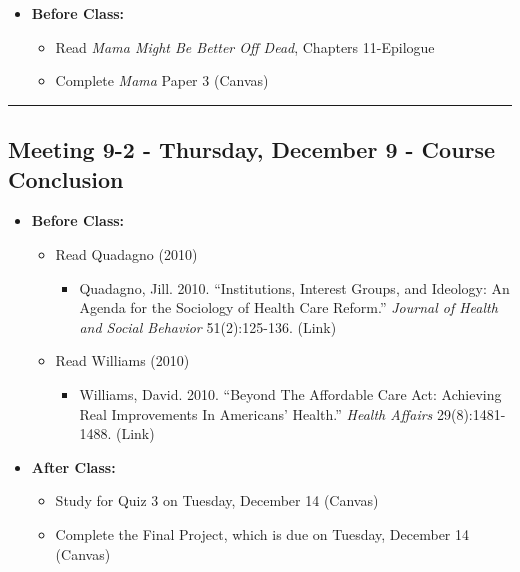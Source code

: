 \documentclass[
]{book}
\providecommand{\tightlist}{%
  \setlength{\itemsep}{0pt}\setlength{\parskip}{0pt}}
\begin{document}
\begin{itemize}
\tightlist
\item
  \textbf{Before Class:}

  \begin{itemize}
  \tightlist
  \item
    Read \emph{Mama Might Be Better Off Dead}, Chapters 11-Epilogue
  \item
    Complete \emph{Mama} Paper 3 (Canvas)
  \end{itemize}
\end{itemize}

\begin{center}\rule{0.5\linewidth}{0.5pt}\end{center}

\hypertarget{meeting-9-2---thursday-december-9---course-conclusion}{%
\subsection*{Meeting 9-2 - Thursday, December 9 - Course Conclusion}\label{meeting-9-2---thursday-december-9---course-conclusion}}

\begin{itemize}
\tightlist
\item
  \textbf{Before Class:}

  \begin{itemize}
  \tightlist
  \item
    Read Quadagno (2010)

    \begin{itemize}
    \tightlist
    \item
      Quadagno, Jill. 2010. ``Institutions, Interest Groups, and Ideology: An Agenda for the Sociology of Health Care Reform.'' \emph{Journal of Health and Social Behavior} 51(2):125-136. (Link)
    \end{itemize}
  \item
    Read Williams (2010)

    \begin{itemize}
    \tightlist
    \item
      Williams, David. 2010. ``Beyond The Affordable Care Act: Achieving Real Improvements In Americans' Health.'' \emph{Health Affairs} 29(8):1481-1488. (Link)
    \end{itemize}
  \end{itemize}
\item
  \textbf{After Class:}

  \begin{itemize}
  \tightlist
  \item
    Study for Quiz 3 on Tuesday, December 14 (Canvas)
  \item
    Complete the Final Project, which is due on Tuesday, December 14 (Canvas)
  \end{itemize}
\end{itemize}

  
\end{document}
